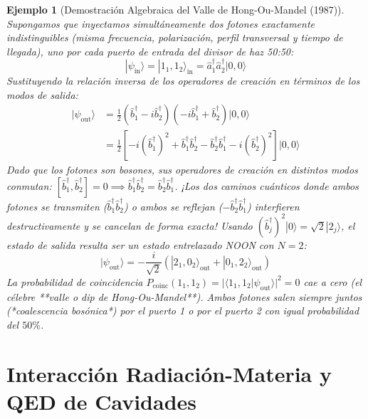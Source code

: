 \documentclass[11pt,a4paper]{book}
\newtheorem{ejemplo}{Ejemplo}[chapter]
\begin{document}
\begin{ejemplo}[Demostración Algebraica del Valle de Hong-Ou-Mandel (1987)]
Supongamos que inyectamos simultáneamente dos fotones exactamente indistinguibles (misma frecuencia, polarización, perfil transversal y tiempo de llegada), uno por cada puerto de entrada del divisor de haz 50:50:
\[
|\psi_{\text{in}}\rangle = |1_1, 1_2\rangle_{\text{in}} = \hat{a}_1^\dagger \hat{a}_2^\dagger |0, 0\rangle
\]
Sustituyendo la relación inversa de los operadores de creación en términos de los modos de salida:
\begin{align}
|\psi_{\text{out}}\rangle &= \frac{1}{2} \left( \hat{b}_1^\dagger - i\hat{b}_2^\dagger \right) \left( -i\hat{b}_1^\dagger + \hat{b}_2^\dagger \right) |0, 0\rangle \\
&= \frac{1}{2} \left[ -i(\hat{b}_1^\dagger)^2 + \hat{b}_1^\dagger \hat{b}_2^\dagger - \hat{b}_2^\dagger \hat{b}_1^\dagger - i(\hat{b}_2^\dagger)^2 \right] |0, 0\rangle
\end{align}
Dado que los fotones son bosones, sus operadores de creación en distintos modos conmutan: $[\hat{b}_1^\dagger, \hat{b}_2^\dagger] = 0 \implies \hat{b}_1^\dagger \hat{b}_2^\dagger = \hat{b}_2^\dagger \hat{b}_1^\dagger$. ¡Los dos caminos cuánticos donde ambos fotones se transmiten ($\hat{b}_1^\dagger \hat{b}_2^\dagger$) o ambos se reflejan ($-\hat{b}_2^\dagger \hat{b}_1^\dagger$) interfieren destructivamente y se cancelan de forma exacta! Usando $(\hat{b}_j^\dagger)^2|0\rangle = \sqrt{2}|2_j\rangle$, el estado de salida resulta ser un estado entrelazado NOON con $N=2$:
\begin{equation}
|\psi_{\text{out}}\rangle = -\frac{i}{\sqrt{2}} \left( |2_1, 0_2\rangle_{\text{out}} + |0_1, 2_2\rangle_{\text{out}} \right)
\end{equation}
La probabilidad de coincidencia $P_{\text{coinc}}(1_1, 1_2) = |\langle 1_1, 1_2 | \psi_{\text{out}} \rangle|^2 = 0$ cae a cero (el célebre **valle o \textit{dip} de Hong-Ou-Mandel**). Ambos fotones salen siempre juntos (*coalescencia bosónica*) por el puerto 1 o por el puerto 2 con igual probabilidad del $50\%$.
\end{ejemplo}

\section[Interacción radiación-materia]{Interacción Radiación-Materia y QED de Cavidades}
\end{document}
